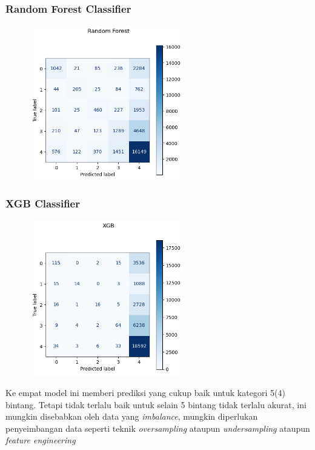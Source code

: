 \documentclass{beamer}
\begin{document}
\begin{frame}
    \frametitle{Random Forest Classifier}
    \graphicspath{ {./images/} }
    \begin{figure}
    \centering
    \includegraphics[width=0.6\textwidth]{rf-confusion.png}
    \end{figure}
\end{frame}

\begin{frame}
    \frametitle{XGB Classifier}
    \graphicspath{ {./images/} }
    \begin{figure}
    \centering
    \includegraphics[width=0.6\textwidth]{xgb-confusion.png}
    \end{figure}
\end{frame}

\begin{frame}
    Ke empat model ini memberi prediksi yang cukup baik untuk kategori 5(4) bintang. 
    Tetapi tidak terlalu baik untuk selain 5 bintang  tidak terlalu akurat, ini mungkin disebabkan oleh data yang \emph{imbalance}, mungkin diperlukan penyeimbangan data seperti teknik \emph{oversampling} ataupun \emph{undersampling} ataupun \emph{feature engineering}
\end{frame}
\end{document}
